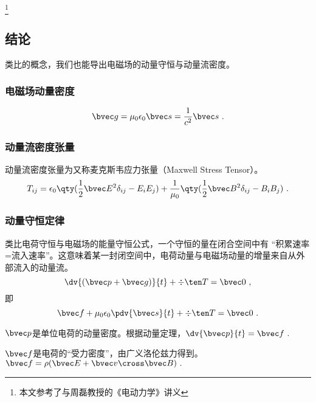 
\footnote{本文参考了\cite{GriffE}与周磊教授的《电动力学》讲义}
\subsection{结论}
类比的概念，我们也能导出电磁场的动量守恒与动量流密度。

\subsubsection{电磁场动量密度}
\begin{equation}
\bvec g = \mu_0 \epsilon_0 \bvec s = \frac{1}{c^2} \bvec s ~.
\end{equation}

\subsubsection{动量流密度张量}
动量流密度张量为又称麦克斯韦应力张量（Maxwell Stress Tensor）。
\begin{equation}\label{eq_EBP_2}
T_{ij} = \epsilon_0 \qty(\frac12 \bvec E^2 \delta_{ij} - E_i E_j) + \frac{1}{\mu_0} \qty(\frac12 \bvec B^2 \delta_{ij} - B_i B_j)~.
\end{equation} 

\subsubsection{动量守恒定律}
类比电荷守恒与电磁场的能量守恒公式，一个守恒的量在闭合空间中有 “积累速率=流入速率”。这意味着某一封闭空间中，电荷动量与电磁场动量的增量来自从外部流入的动量流。
\begin{equation}
\dv{(\bvec p + \bvec g)}{t} + \div \ten T = \bvec 0~,
\end{equation}
即
\begin{equation}\label{eq_EBP_1}
\bvec f  + \mu_0 \epsilon_0 \pdv{\bvec s}{t} + \div \ten T= \bvec 0~.
\end{equation} 

$\bvec p$是单位电荷的动量密度。根据动量定理，$\dv{\bvec p}{t} = \bvec f~.$

$\bvec f$是电荷的“受力密度”，由广义洛伦兹力得到。$\bvec f = \rho (\bvec E + \bvec v \cross \bvec B)~.$

